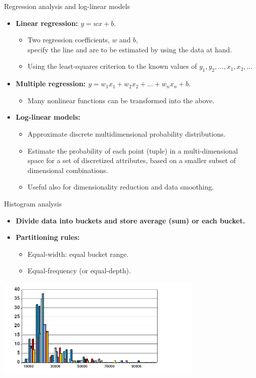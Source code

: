 \documentclass[aspectratio=169,t]{beamer}
\begin{document}
  { 
    \begin{frame}{Regression analysis and log-linear models}
    \begin{itemize}
      \item \textbf{Linear regression: $y = wx + b$}.
      \begin{itemize}
        \item Two regression coefficients, $w$ and $b$, \\
              specify the line and are to be estimated by using the data at hand.
        \item Using the least-squares criterion to the known values of $y_1,y_2, \ldots, x_1,x_2,\ldots$
      \end{itemize}
      \item \textbf{Multiple regression: $y = w_1 x_1 + w_2 x_2 + \ldots + w_n x_n + b$}.
      \begin{itemize}
        \item Many nonlinear functions can be transformed into the above.
      \end{itemize}
      \item \textbf{Log-linear models:}
      \begin{itemize}
        \item Approximate discrete multidimensional probability distributions.
        \item Estimate the probability of each point (tuple) in a multi-dimensional space for a set of discretized attributes, based on a smaller subset of dimensional combinations.
        \item Useful also for dimensionality reduction and data smoothing.
      \end{itemize}
    \end{itemize}
    \end{frame}
  }

  { 
    \begin{frame}{Histogram analysis}
    \begin{itemize}
      \item \textbf{Divide data into buckets and store average (sum) or each bucket.}
      \item \textbf{Partitioning rules:}
      \begin{itemize}
        \item Equal-width: equal bucket range.
        \item Equal-frequency (or equal-depth).
      \end{itemize}
    \end{itemize}
    \includegraphics[width=10cm]{img/histogram.png}
    \end{frame}
  }
\end{document}
